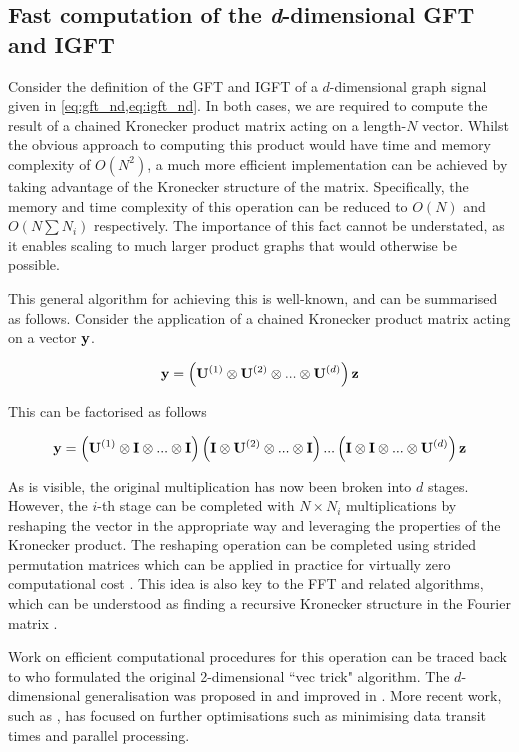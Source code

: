 \subsection{Fast computation of the \textit{d}-dimensional GFT and IGFT}

\label{sec:fast_kron_dd}

Consider the definition of the GFT and IGFT of a $d$-dimensional graph signal given in \cref{eq:gft_nd,eq:igft_nd}. In both cases, we are required to compute the result of a chained Kronecker product matrix acting on a length-$N$ vector. Whilst the obvious approach to computing this product would have time and memory complexity of $O(N^2)$, a much more efficient implementation can be achieved by taking advantage of the Kronecker structure of the matrix. Specifically, the memory and time complexity of this operation can be reduced to $O(N)$ and $O(N\sum N_i)$ respectively. The importance of this fact cannot be understated, as it enables scaling to much larger product graphs that would otherwise be possible. 

This general algorithm for achieving this is well-known, and can be summarised as follows. Consider the application of a chained Kronecker product matrix acting on a vector $\mathbf{y}$. 

$$
\mathbf{y} = \left( \mathbf{U}^{(1)} \otimes \mathbf{U}^{(2)} \otimes ... \otimes \mathbf{U}^{(d)}\right) \mathbf{z}
$$

This can be factorised as follows

$$
\mathbf{y} = \left( \mathbf{U}^{(1)} \otimes \mathbf{I} \otimes ... \otimes \mathbf{I} \right)\left( \mathbf{I} \otimes \mathbf{U}^{(2)} \otimes ... \otimes \mathbf{I} \right) ... \left( \mathbf{I} \otimes \mathbf{I} \otimes ... \otimes \mathbf{U}^{(d)} \right) \mathbf{z}
$$

As is visible, the original multiplication has now been broken into $d$ stages. However, the $i$-th stage can be completed with $N \times N_i$ multiplications by reshaping the vector in the appropriate way and leveraging the properties of the Kronecker product. The reshaping operation can be completed using strided permutation matrices which can be applied in practice for virtually zero computational cost \citep{Granata1992}. This idea is also key to the FFT and related algorithms, which can be understood as finding a recursive Kronecker structure in the Fourier matrix \citep{Tolimieri2013}. 

Work on efficient computational procedures for this operation can be traced back to \cite{Roth1934} who formulated the original 2-dimensional ``vec trick" algorithm. The $d$-dimensional generalisation was proposed in \cite{Pereyra1973} and improved in \cite{DeBoor1979}. More recent work, such as \cite{Fackler2019}, has focused on further optimisations such as minimising data transit times and parallel processing. 

